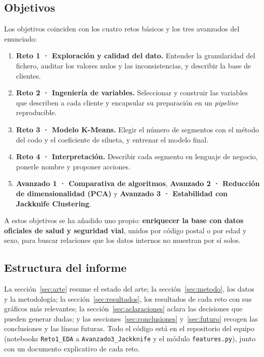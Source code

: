 \documentclass[11pt,a4paper]{article}
\begin{document}
\subsection{Objetivos}

Los objetivos coinciden con los cuatro retos básicos y los tres avanzados del enunciado:
\begin{enumerate}
  \item \textbf{Reto 1 · Exploración y calidad del dato.} Entender la granularidad del fichero, auditar los valores nulos
        y las inconsistencias, y describir la base de clientes.
  \item \textbf{Reto 2 · Ingeniería de variables.} Seleccionar y construir las variables que describen a cada cliente y
        encapsular su preparación en un \emph{pipeline} reproducible.
  \item \textbf{Reto 3 · Modelo K-Means.} Elegir el número de segmentos con el método del codo y el coeficiente de
        silueta, y entrenar el modelo final.
  \item \textbf{Reto 4 · Interpretación.} Describir cada segmento en lenguaje de negocio, ponerle nombre y proponer
        acciones.
  \item \textbf{Avanzado 1 · Comparativa de algoritmos}, \textbf{Avanzado 2 · Reducción de dimensionalidad (PCA)} y
        \textbf{Avanzado 3 · Estabilidad con Jackknife Clustering}.
\end{enumerate}

A estos objetivos se ha añadido uno propio: \textbf{enriquecer la base con datos oficiales de salud y seguridad vial},
unidos por código postal o por edad y sexo, para buscar relaciones que los datos internos no muestran por sí solos.

\subsection{Estructura del informe}

La sección~\ref{sec:arte} resume el estado del arte; la sección~\ref{sec:metodo}, los datos y la metodología; la
sección~\ref{sec:resultados}, los resultados de cada reto con sus gráficos más relevantes; la
sección~\ref{sec:aclaraciones} aclara las decisiones que pueden generar dudas; y las secciones~\ref{sec:conclusiones}
y~\ref{sec:futuro} recogen las conclusiones y las líneas futuras. Todo el código está en el repositorio del equipo
(notebooks \texttt{Reto1\_EDA} a \texttt{Avanzado3\_Jackknife} y el módulo \texttt{features.py}), junto con un documento
explicativo de cada reto.
\end{document}
